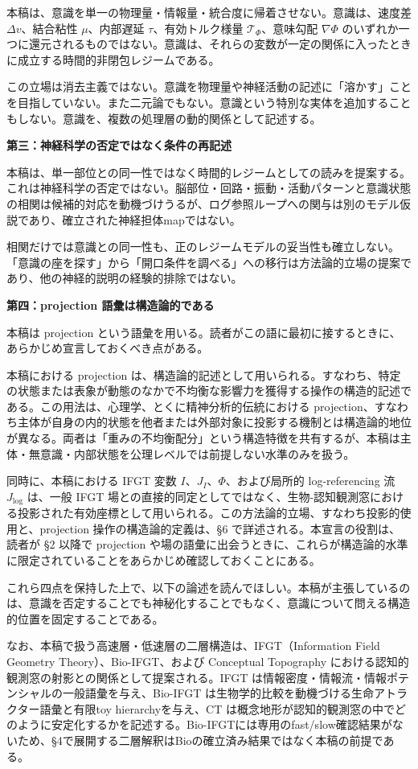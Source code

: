 本稿は、意識を単一の物理量・情報量・統合度に帰着させない。意識は、速度差 $\Delta v$、結合粘性 $\mu$、内部遅延 $\tau$、有効トルク様量 $\mathcal{T}_{\Phi}$、意味勾配 $\nabla\Phi$ のいずれか一つに還元されるものではない。意識は、それらの変数が一定の関係に入ったときに成立する時間的非閉包レジームである。

この立場は消去主義ではない。意識を物理量や神経活動の記述に「溶かす」ことを目指していない。また二元論でもない。意識という特別な実体を追加することもしない。意識を、複数の処理層の動的関係として記述する。

\textbf{第三：神経科学の否定ではなく条件の再記述}

本稿は、単一部位との同一性ではなく時間的レジームとしての読みを提案する。これは神経科学の否定ではない。脳部位・回路・振動・活動パターンと意識状態の相関は候補的対応を動機づけうるが、ログ参照ループへの関与は別のモデル仮説であり、確立された神経担体mapではない。

相関だけでは意識との同一性も、正のレジームモデルの妥当性も確立しない。「意識の座を探す」から「開口条件を調べる」への移行は方法論的立場の提案であり、他の神経的説明の経験的排除ではない。

\textbf{第四：projection 語彙は構造論的である}

本稿は projection という語彙を用いる。読者がこの語に最初に接するときに、あらかじめ宣言しておくべき点がある。

本稿における projection は、構造論的記述として用いられる。すなわち、特定の状態または表象が動態のなかで不均衡な影響力を獲得する操作の構造的記述である。この用法は、心理学、とくに精神分析的伝統における projection、すなわち主体が自身の内的状態を他者または外部対象に投影する機制とは構造論的地位が異なる。両者は「重みの不均衡配分」という構造特徴を共有するが、本稿は主体・無意識・内部状態を公理レベルでは前提しない水準のみを扱う。

同時に、本稿における IFGT 変数 $I$、$J_I$、$\Phi$、および局所的 log-referencing 流 $J_{\log}$ は、一般 IFGT 場との直接的同定としてではなく、生物-認知観測窓における投影された有効座標として用いられる。この方法論的立場、すなわち投影的使用と、projection 操作の構造論的定義は、§6 で詳述される。本宣言の役割は、読者が §2 以降で projection や場の語彙に出会うときに、これらが構造論的水準に限定されていることをあらかじめ確認しておくことにある。

これら四点を保持した上で、以下の論述を読んでほしい。本稿が主張しているのは、意識を否定することでも神秘化することでもなく、意識について問える構造的位置を固定することである。

なお、本稿で扱う高速層・低速層の二層構造は、IFGT（Information Field Geometry Theory）、Bio-IFGT、および Conceptual Topography における認知的観測窓の射影との関係として提案される。IFGT は情報密度・情報流・情報ポテンシャルの一般語彙を与え、Bio-IFGT は生物学的比較を動機づける生命アトラクター語彙と有限toy hierarchyを与え、CT は概念地形が認知的観測窓の中でどのように安定化するかを記述する。Bio-IFGTには専用のfast/slow確認結果がないため、§4で展開する二層解釈はBioの確立済み結果ではなく本稿の前提である。
